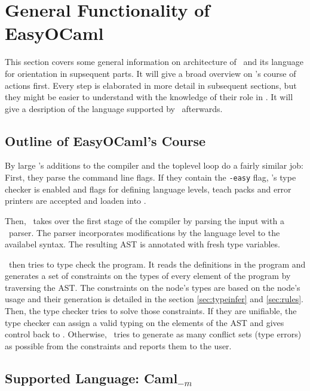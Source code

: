 
\section{General Functionality of EasyOCaml}

This section covers some general information on architecture of \easyocaml\ and
its language for orientation in supsequent parts.
It will give a broad overview on \easyocaml's course of actions first.
Every step is elaborated in more detail in subsequent sections, but they might
be easier to understand with the knowledge of their role in \easyocaml.
It will give a desription of the language supported by \easyocaml\ afterwards.

\subsection{Outline of EasyOCaml's Course}

By large \easyocaml's additions to the compiler and the toplevel loop do a
fairly similar job: First, they parse the command line flags. If they
contain the \texttt{-easy} flag, \easyocaml's type checker is enabled and flags
for defining language levels, teach packs and error printers are accepted and
loaden into \easyocaml.

Then, \easyocaml\ takes over the first stage of the compiler by parsing the
input with a \camlpf\ parser. The parser incorporates modifications by the
language level to the availabel syntax. The resulting AST is annotated with
fresh type variables.

\easyocaml\ then tries to type check the program. It reads the definitions in
the program and generates a set of constraints on the types of every element of
the program by traversing the AST. The constraints on the node's types are based
on the node's usage and their generation is detailed in the section
\ref{sec:typeinfer} and \ref{sec:rules}.
Then, the type checker tries to solve those constraints. If they are unifiable,
the type checker can assign a valid typing on the elements of the AST and gives
control back to \ocaml.
Otherwise, \easyocaml\ tries to generate as many conflict sets (type errors) as
possible from the constraints and reports them to the user.

\subsection{Supported Language: Caml$_{-m}$}
\label{sec:language}

